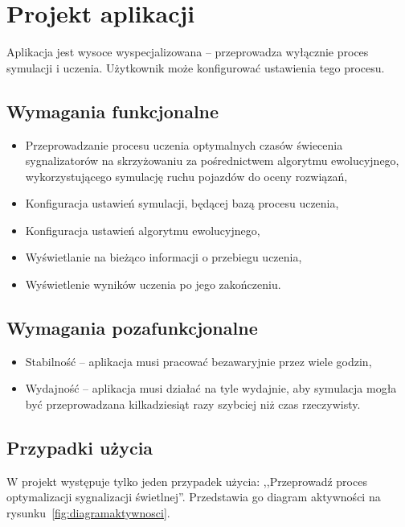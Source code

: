 \chapter*{Projekt aplikacji}
Aplikacja jest wysoce wyspecjalizowana -- przeprowadza wyłącznie proces symulacji i uczenia. Użytkownik może konfigurować ustawienia tego procesu.
\section*{Wymagania funkcjonalne}
\begin{itemize}
	\item Przeprowadzanie procesu uczenia optymalnych czasów świecenia sygnalizatorów na skrzyżowaniu za pośrednictwem algorytmu ewolucyjnego, wykorzystującego symulację ruchu pojazdów do oceny rozwiązań, 
	\item Konfiguracja ustawień symulacji, będącej bazą procesu uczenia,
	\item Konfiguracja ustawień algorytmu ewolucyjnego,
	\item Wyświetlanie na bieżąco informacji o przebiegu uczenia,
	\item Wyświetlenie wyników uczenia po jego zakończeniu.
\end{itemize}
\section*{Wymagania pozafunkcjonalne}
\begin{itemize}
	\item Stabilność -- aplikacja musi pracować bezawaryjnie przez wiele godzin,
	\item Wydajność -- aplikacja musi działać na tyle wydajnie, aby symulacja mogła być przeprowadzana kilkadziesiąt razy szybciej niż czas rzeczywisty.
\end{itemize}
\section*{Przypadki użycia}
W projekt występuje tylko jeden przypadek użycia: ,,Przeprowadź proces optymalizacji sygnalizacji świetlnej''. Przedstawia go diagram aktywności na rysunku~\ref{fig:diagramaktywnosci}. 
